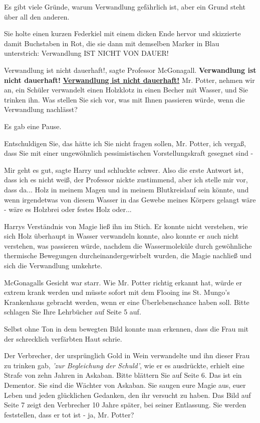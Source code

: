 \glqq{}Es gibt viele Gründe, warum Verwandlung gefährlich ist, aber ein Grund
steht über all den anderen.\grqq{}

Sie holte einen kurzen Federkiel mit einem dicken Ende hervor und skizzierte
damit Buchstaben in Rot, die sie dann mit demselben Marker in Blau unterstrich:
Verwandlung IST NICHT VON DAUER!

\glqq{}Verwandlung ist nicht dauerhaft!\grqq{}, sagte Professor McGonagall.
\glqq{}\textbf{Verwandlung ist nicht dauerhaft!} \textbf{\underline{Verwandlung
ist nicht dauerhaft!}} Mr. Potter, nehmen wir an, ein Schüler verwandelt einen
Holzklotz in einen Becher mit Wasser, und Sie trinken ihn. Was stellen Sie sich
vor, was mit Ihnen passieren würde, wenn die Verwandlung nachlässt?\grqq{}

Es gab eine Pause.

\glqq{}Entschuldigen Sie, das hätte ich Sie nicht fragen sollen, Mr. Potter, ich
vergaß, dass Sie mit einer ungewöhnlich pessimistischen Vorstellungskraft
gesegnet sind -\grqq{}

\glqq{}Mir geht es gut\grqq{}, sagte Harry und schluckte schwer. \glqq{}Also die
erste Antwort ist, dass ich es nicht weiß\grqq{}, der Professor nickte
zustimmend, \glqq{}aber ich stelle mir vor, dass da... Holz in meinem Magen und
in meinem Blutkreislauf sein könnte, und wenn irgendetwas von diesem Wasser in
das Gewebe meines Körpers gelangt wäre - wäre es Holzbrei oder festes Holz
oder...\grqq{}

Harrys Verständnis von Magie ließ ihn im Stich. Er konnte nicht verstehen, wie
sich Holz überhaupt in Wasser verwandeln konnte, also konnte er auch nicht
verstehen, was passieren würde, nachdem die Wassermoleküle durch gewöhnliche
thermische Bewegungen durcheinandergewirbelt wurden, die Magie nachließ und sich
die Verwandlung umkehrte.

McGonagalls Gesicht war starr. \glqq{}Wie Mr. Potter richtig erkannt hat, würde
er extrem krank werden und müsste sofort mit dem Flooing ins St. Mungo's
Krankenhaus gebracht werden, wenn er eine Überlebenschance haben soll. Bitte
schlagen Sie Ihre Lehrbücher auf Seite 5 auf.\grqq{}

Selbst ohne Ton in dem bewegten Bild konnte man erkennen, dass die Frau mit der
schrecklich verfärbten Haut schrie.

\glqq{}Der Verbrecher, der ursprünglich Gold in Wein verwandelte und ihn dieser
Frau zu trinken gab, \emph{'zur Begleichung der Schuld'}, wie er es ausdrückte,
erhielt eine Strafe von zehn Jahren in Askaban. Bitte blättern Sie auf Seite 6.
Das ist ein Dementor. Sie sind die Wächter von Askaban. Sie saugen eure Magie
aus, euer Leben und jeden glücklichen Gedanken, den ihr versucht zu haben. Das
Bild auf Seite 7 zeigt den Verbrecher 10 Jahre später, bei seiner Entlassung.
Sie werden feststellen, dass er tot ist - ja, Mr. Potter?\grqq{}

